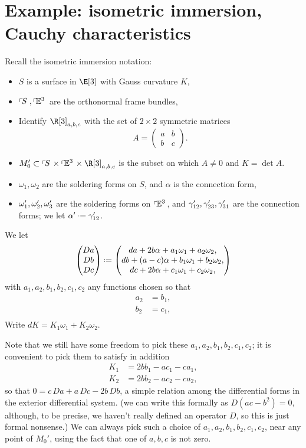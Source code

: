 \section{Example: isometric immersion, Cauchy characteristics}
Recall the isometric immersion notation: 
\begin{itemize}
\item
\(S\) is a surface in \(\E[3]\) with Gauss curvature \(K\),
\item
\(\left\ulcorner\!S\right.,\left\ulcorner\!\mathbb{E}^{3}\right.\) are the orthonormal frame bundles,
\item
Identify \(\R[3]_{a,b,c}\) with the set of \(2 \times 2\) symmetric matrices
\[
A=
\begin{pmatrix}
a&b\\
b&c
\end{pmatrix}.
\]
\item
\(M_0'\subset \frameBundle{S} \times \frameBundleE{3} \times \R[3]_{a,b,c}\) is the subset on which \(A\ne 0\) and \(K=\det A\).
\item
\(\omega_1,\omega_2\) are the soldering forms on \(S\), and \(\alpha\) is the connection form,
\item
\(\omega'_1,\omega'_2,\omega'_3\) are the soldering forms on \(\left\ulcorner\!\mathbb{E}^{3}\right.\), and \(\gamma'_{12},\gamma'_{23},\gamma'_{31}\) are the connection forms; we let \(\otalpha\defeq\qc_{12}\).
\end{itemize}
We let
\[
\begin{pmatrix}
Da \\
Db \\
Dc
\end{pmatrix}
\defeq 
\begin{pmatrix}
da + 2b\alpha + a_1 \pf_1 + a_2 \pf_2, \\
db + (a-c)\alpha + b_1 \pf_1 + b_2 \pf_2, \\
dc + 2b \alpha  + c_1 \pf_1 + c_2 \pf_2,
\end{pmatrix}
\]
with \(a_1,a_2,b_1,b_2,c_1,c_2\) any functions chosen so that
\begin{align*}
a_2 &= b_1, \\
b_2 &= c_1, \\
\end{align*}
Write \(dK=K_1\omega_1+K_2\omega_2\).

Note that we still have some freedom to pick these \(a_1,a_2,b_1,b_2,c_1,c_2\); 
it is convenient to pick them to satisfy in addition
\begin{align*}
K_1 &= 2bb_1-ac_1-ca_1, \\
K_2 &= 2bb_2-ac_2-ca_2,
\end{align*}
so that \(0=c \, Da + a \, Dc - 2b \, Db\), a simple relation among the differential forms in the exterior differential system.
(we can write this formally as \(D(ac-b^2)=0\), although, to be precise, we haven't really defined an operator \(D\), so this is just formal nonsense.)
We can always pick such a choice of \(a_1,a_2,b_1,b_2,c_1,c_2\), near any point of \(M_0'\), using the fact that one of \(a,b,c\) is not zero.

